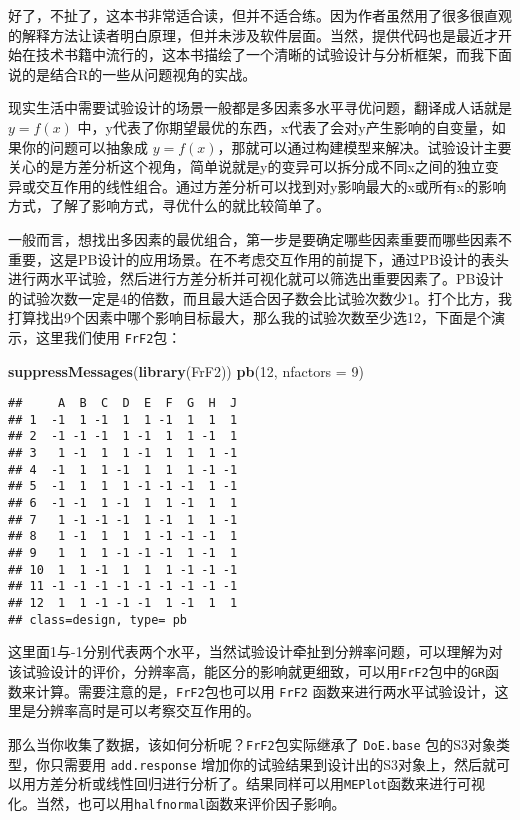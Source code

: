 \documentclass[]{tufte-book}
\newenvironment{Shaded}{}{}
\newcommand{\DataTypeTok}[1]{\textcolor[rgb]{0.56,0.13,0.00}{#1}}
\newcommand{\DecValTok}[1]{\textcolor[rgb]{0.25,0.63,0.44}{#1}}
\newcommand{\KeywordTok}[1]{\textcolor[rgb]{0.00,0.44,0.13}{\textbf{#1}}}
\newcommand{\NormalTok}[1]{#1}
\begin{document}
好了，不扯了，这本书非常适合读，但并不适合练。因为作者虽然用了很多很直观的解释方法让读者明白原理，但并未涉及软件层面。当然，提供代码也是最近才开始在技术书籍中流行的，这本书描绘了一个清晰的试验设计与分析框架，而我下面说的是结合R的一些从问题视角的实战。

现实生活中需要试验设计的场景一般都是多因素多水平寻优问题，翻译成人话就是 \(y = f(x)\) 中，y代表了你期望最优的东西，x代表了会对y产生影响的自变量，如果你的问题可以抽象成 \(y = f(x)\)，那就可以通过构建模型来解决。试验设计主要关心的是方差分析这个视角，简单说就是y的变异可以拆分成不同x之间的独立变异或交互作用的线性组合。通过方差分析可以找到对y影响最大的x或所有x的影响方式，了解了影响方式，寻优什么的就比较简单了。

一般而言，想找出多因素的最优组合，第一步是要确定哪些因素重要而哪些因素不重要，这是PB设计的应用场景。在不考虑交互作用的前提下，通过PB设计的表头进行两水平试验，然后进行方差分析并可视化就可以筛选出重要因素了。PB设计的试验次数一定是4的倍数，而且最大适合因子数会比试验次数少1。打个比方，我打算找出9个因素中哪个影响目标最大，那么我的试验次数至少选12，下面是个演示，这里我们使用 \texttt{FrF2}包：

\begin{Shaded}
\begin{Highlighting}[]
\KeywordTok{suppressMessages}\NormalTok{(}\KeywordTok{library}\NormalTok{(FrF2))}
\KeywordTok{pb}\NormalTok{(}\DecValTok{12}\NormalTok{, }\DataTypeTok{nfactors =} \DecValTok{9}\NormalTok{)}
\end{Highlighting}
\end{Shaded}

\begin{verbatim}
##     A  B  C  D  E  F  G  H  J
## 1  -1  1 -1  1  1 -1  1  1  1
## 2  -1 -1 -1  1 -1  1  1 -1  1
## 3   1 -1  1  1 -1  1  1  1 -1
## 4  -1  1  1 -1  1  1  1 -1 -1
## 5  -1  1  1  1 -1 -1 -1  1 -1
## 6  -1 -1  1 -1  1  1 -1  1  1
## 7   1 -1 -1 -1  1 -1  1  1 -1
## 8   1 -1  1  1  1 -1 -1 -1  1
## 9   1  1  1 -1 -1 -1  1 -1  1
## 10  1  1 -1  1  1  1 -1 -1 -1
## 11 -1 -1 -1 -1 -1 -1 -1 -1 -1
## 12  1  1 -1 -1 -1  1 -1  1  1
## class=design, type= pb
\end{verbatim}

这里面1与-1分别代表两个水平，当然试验设计牵扯到分辨率问题，可以理解为对该试验设计的评价，分辨率高，能区分的影响就更细致，可以用\texttt{FrF2}包中的\texttt{GR}函数来计算。需要注意的是，\texttt{FrF2}包也可以用 \texttt{FrF2} 函数来进行两水平试验设计，这里是分辨率高时是可以考察交互作用的。

那么当你收集了数据，该如何分析呢？\texttt{FrF2}包实际继承了 \texttt{DoE.base} 包的S3对象类型，你只需要用 \texttt{add.response} 增加你的试验结果到设计出的S3对象上，然后就可以用方差分析或线性回归进行分析了。结果同样可以用\texttt{MEPlot}函数来进行可视化。当然，也可以用\texttt{halfnormal}函数来评价因子影响。
\end{document}
